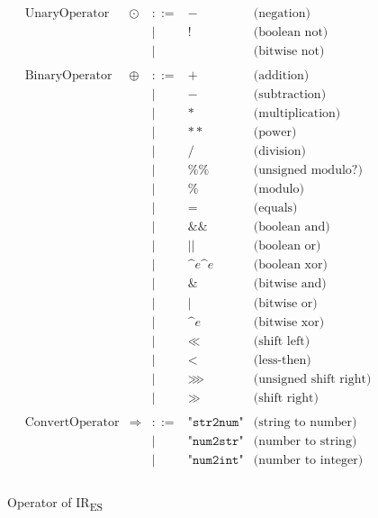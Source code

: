 \documentclass[acmsmall,screen]{acmart}
\newcommand{\irname}[0]{IR\textsubscript{ES}\xspace}
\newcommand{\Cd}[1]{\texttt{#1}}
\newcommand{\primitive}[1]{ \Cd{#1}}
\begin{document}
\begin{figure}[t]
\[
\begin{array}{rrrll}
\text{UnaryOperator}& \odot & ::= & - & \text{(negation)}\\
&&|& ! & \text{(boolean not)}\\
&&|& ~ & \text{(bitwise not)}\\
\\

\text{BinaryOperator}& \oplus & ::= & + & \text{(addition)}\\
&&|& - & \text{(subtraction)}\\
&&|& * & \text{(multiplication)}\\
&&|& ** & \text{(power)}\\
&&|& / & \text{(division)}\\
&&|& \%\% & \text{(unsigned modulo?)}\\
&&|& \% & \text{(modulo)}\\
&&|& = & \text{(equals)}\\
&&|& \&\& & \text{(boolean and)}\\
&&|& || & \text{(boolean or)}\\
&&|& \^{e}\^{e} & \text{(boolean xor)}\\
&&|& \& & \text{(bitwise and)}\\
&&|& | & \text{(bitwise or)}\\
&&|& \^{e} & \text{(bitwise xor)}\\
&&|& \ll & \text{(shift left)}\\
&&|& < & \text{(less-then)}\\
&&|& \ggg & \text{(unsigned shift right)}\\
&&|& \gg & \text{(shift right)}\\
\\

\text{ConvertOperator} & \Longrightarrow
& ::= & \primitive{"str2num"}& \text{(string to number)}\\
&&|& \primitive{"num2str"} & \text{(number to string)}\\
&&|& \primitive{"num2int"} & \text{(number to integer)}\\
\\
\end{array}
\]
\caption{Operator of \irname}
\label{fig:op}
\end{figure}
\end{document}
